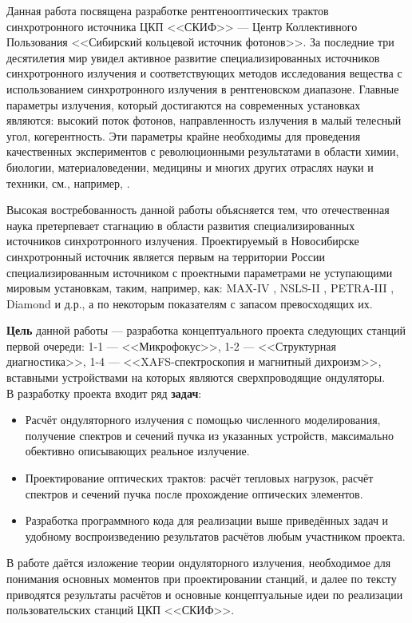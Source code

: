 {\actuality}
Данная работа посвящена разработке рентгенооптических трактов синхротронного источника ЦКП <<СКИФ>> --- Центр Коллективного Пользования <<Сибирский кольцевой источник фотонов>>. За последние три десятилетия мир увидел активное развитие специализированных источников синхротронного излучения и соответствующих методов исследования вещества с использованием синхротронного излучения в рентгеновском диапазоне. Главные параметры излучения, который достигаются на современных установках являются: высокий поток фотонов, направленность излучения в малый телесный угол, когерентность. Эти параметры крайне необходимы для проведения качественных экспериментов с революционными результатами в области химии, биологии, материаловедении, медицины и многих других отраслях науки и техники, см., например, \cite{willmott2019introduction}.

Высокая востребованность данной работы объясняется тем, что отечественная наука претерпевает стагнацию в области развития специализированных источников синхротронного излучения. Проектируемый в Новосибирске синхротронный источник является первым на территории России специализированным источником с проектными параметрами не уступающими мировым установкам, таким, например, как: MAX-IV \cite{max2010max}, NSLS-II \cite{NSLS}, PETRA-III \cite{balewski2004petra}, Diamond \cite{DIAMOND} и д.р., а по некоторым показателям с запасом превосходящих их\cite{zorin2019radiation}.

\textbf{Цель} данной работы --- разработка концептуального проекта следующих станций первой очереди: 1-1 --- <<Микрофокус>>, 1-2 --- <<Структурная диагностика>>, 1-4 --- <<XAFS-спектроскопия и магнитный дихроизм>>, вставными устройствами на которых являются сверхпроводящие ондуляторы.\\

В разработку проекта входит ряд \textbf{задач}:
\begin{itemize}

	\item Расчёт ондуляторного излучения с помощью численного моделирования, получение спектров и сечений пучка из указанных устройств, максимально обективно описывающих реальное излучение.
	\item Проектирование оптических трактов: расчёт тепловых нагрузок, расчёт спектров и сечений пучка после прохождение оптических элементов. 
	\item Разработка программного кода для реализации выше приведённых задач и удобному воспроизведению результатов расчётов любым участником проекта.
\end{itemize}

В работе даётся изложение теории ондуляторного излучения, необходимое для понимания основных моментов при проектировании станций, и далее по тексту приводятся результаты расчётов и основные концептуальные идеи по реализации пользовательских станций ЦКП <<СКИФ>>.


